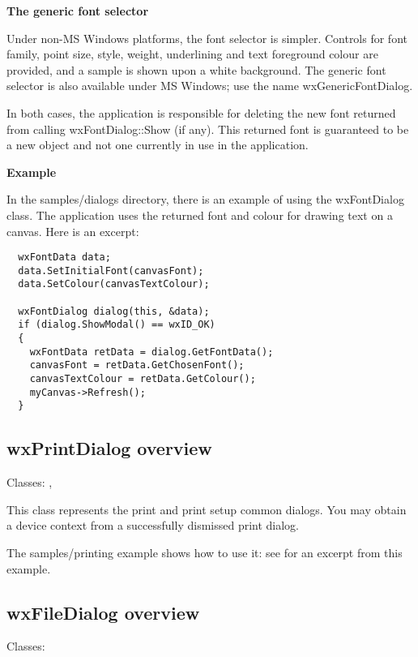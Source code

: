 {\bf The generic font selector}

Under non-MS Windows platforms, the font selector is simpler.
Controls for font family, point size, style, weight,
underlining and text foreground colour are provided, and
a sample is shown upon a white background. The generic font selector
is also available under MS Windows; use the name wxGenericFontDialog.

In both cases, the application is responsible for deleting the
new font returned from calling wxFontDialog::Show (if any).
This returned font is guaranteed to be a new object and not
one currently in use in the application.

{\bf Example}

In the samples/dialogs directory, there is an example of using
the wxFontDialog class. The application uses the returned font
and colour for drawing text on a canvas. Here is an excerpt:

\begin{verbatim}
  wxFontData data;
  data.SetInitialFont(canvasFont);
  data.SetColour(canvasTextColour);
      
  wxFontDialog dialog(this, &data);
  if (dialog.ShowModal() == wxID_OK)
  {
    wxFontData retData = dialog.GetFontData();
    canvasFont = retData.GetChosenFont();
    canvasTextColour = retData.GetColour();
    myCanvas->Refresh();
  }
\end{verbatim}

\subsection{wxPrintDialog overview}\label{wxprintdialogoverview}

Classes: , 

This class represents the print and print setup common dialogs.
You may obtain a  device context from
a successfully dismissed print dialog.

The samples/printing example shows how to use it: see  for
an excerpt from this example.

\subsection{wxFileDialog overview}\label{wxfiledialogoverview}

Classes: 

